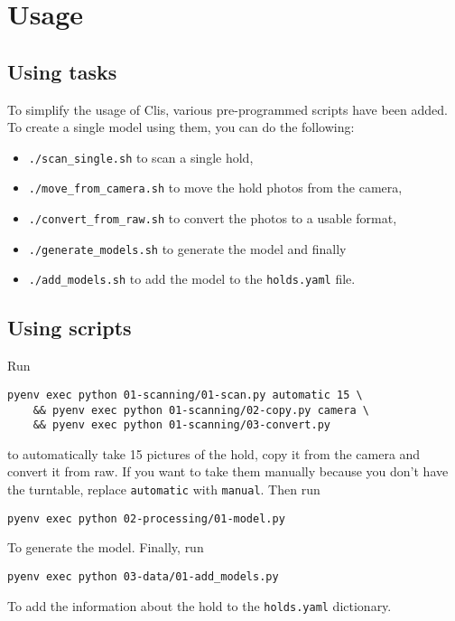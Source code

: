 \section{Usage}

\subsection{Using tasks}

To simplify the usage of Clis, various pre-programmed scripts have been added.
To create a single model using them, you can do the following:

\begin{itemize}
	\item \texttt{./scan_single.sh} to scan a single hold,
	\item \texttt{./move_from_camera.sh} to move the hold photos from the camera,
	\item \texttt{./convert_from_raw.sh} to convert the photos to a usable format,
	\item \texttt{./generate_models.sh} to generate the model and finally
	\item \texttt{./add_models.sh} to add the model to the \texttt{holds.yaml} file.
\end{itemize}

\subsection{Using scripts}

Run

\begin{verbatim}
pyenv exec python 01-scanning/01-scan.py automatic 15 \
	&& pyenv exec python 01-scanning/02-copy.py camera \
	&& pyenv exec python 01-scanning/03-convert.py
\end{verbatim}

to automatically take 15 pictures of the hold, copy it from the camera
and convert it from raw. If you want to take them manually because you
don't have the turntable, replace \texttt{automatic} with
\texttt{manual}. Then run

\begin{verbatim}
pyenv exec python 02-processing/01-model.py
\end{verbatim}

To generate the model. Finally, run

\begin{verbatim}
pyenv exec python 03-data/01-add_models.py
\end{verbatim}

To add the information about the hold to the \texttt{holds.yaml}
dictionary.
